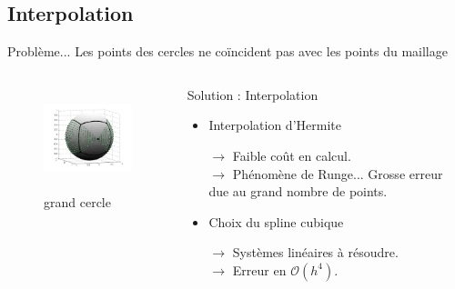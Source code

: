 \documentclass[11pt]{beamer}
\begin{document}

\subsection{Interpolation}
\begin{frame}

  \begin{alertblock}{Problème...}
  Les points des cercles ne coïncident pas avec les points du maillage  
  \end{alertblock}
  
\begin{columns}

\begin{figure}
\begin{center}
\includegraphics[height=3cm]{fig22.jpg}
\end{center}
\caption{grand cercle}
\end{figure}

\pause
{}

\begin{exampleblock}{Solution : Interpolation}
  \begin{itemize}
  \item Interpolation d'Hermite

    $\rightarrow$ Faible coût en calcul. \\
    $\rightarrow$ Phénomène de Runge... Grosse erreur due au grand nombre de points.

  \item Choix du spline cubique

    $\rightarrow$ Systèmes linéaires à résoudre.\\
    $\rightarrow$ Erreur en $\mathcal{O}\left( h^4 \right)$.
  \end{itemize}
\end{exampleblock}
\end{columns}
\end{frame}

\begin{frame}
\tableofcontents
\end{frame}

\end{document}
